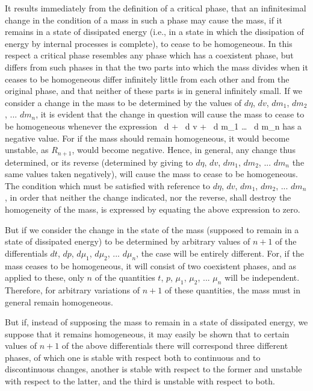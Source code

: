 \documentclass[12pt]{article}
\begin{document}
It results immediately from the definition of a critical phase, that an infinitesimal change in the condition of a mass in such a phase may cause the mass, if it remains in a state of dissipated energy (i.e., in a state in which the dissipation of energy by internal processes is complete), to cease to be homogeneous. In this respect a critical phase resembles any phase which has a coexistent phase, but differs from such phases in that the two parts into which the mass divides when it ceases to be homogeneous differ infinitely little from each other and from the original phase, and that neither of these parts is in general infinitely small. If we consider a change in the mass to be determined by the values of $d \eta$, $dv$, $dm_1$, $dm_2$, ... $dm_n$, it is evident that the change in question will cause the mass to cease to be homogeneous whenever the expression
\eqs {} \, d \eta +  \, d v +  \, d m_1 \dots {} \, d m_n 
\label{209}\eqe
has a negative value. For if the mass should remain homogeneous, it would become unstable, as $R_{n+1}$, would become negative. Hence, in general, any change thus determined, or its reverse (determined by giving to $d \eta$, $dv$, $dm_1$, $dm_2$, ... $dm_n$ the same values taken negatively), will cause the mass to cease to be homogeneous. The condition which must be satisfied with reference to $d \eta$, $dv$, $dm_1$, $dm_2$, ... $dm_n$, in order that neither the change indicated, nor the reverse, shall destroy the homogeneity of the mass, is expressed by equating the above expression to zero.


But if we consider the change in the state of the mass (supposed to remain in a state of dissipated energy) to be determined by arbitrary values of $n +1$ of the differentials $dt$, $dp$, $d\mu_1$, $d\mu_2$, ... $d\mu_n$, the case will be entirely different. For, if the mass ceases to be homogeneous, it will consist of two coexistent phases, and as applied to these, only $n$ of the quantities $t$, $p$, $\mu_1$, $\mu_2$, ... $\mu_n$ will be independent. Therefore, for arbitrary variations of $n+1$ of these quantities, the mass must in general remain homogeneous.


But if, instead of supposing the mass to remain in a state of dissipated energy, we suppose that it remains homogeneous, it may easily be shown that to certain values of $n+1$ of the above differentials there will correspond three different phases, of which one is stable with respect both to continuous and to discontinuous changes, another is stable with respect to the former and unstable with respect to the latter, and the third is unstable with respect to both.
\end{document}
